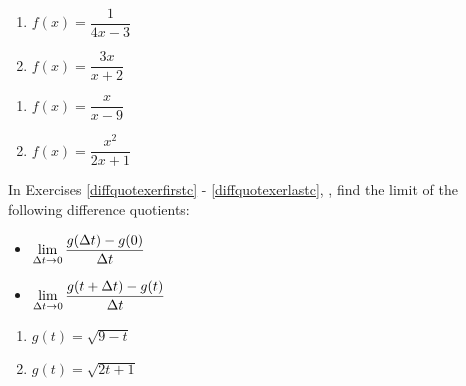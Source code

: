 \begin{multicols}{2}
\begin{enumerate}
\setcounter{enumi}{\value{HW}}

\item $f(x) = \dfrac{1}{4x-3}$ 
\item $f(x) = \dfrac{3x}{x+2}$ 

\setcounter{HW}{\value{enumi}}
\end{enumerate}
\end{multicols}

\begin{multicols}{2}
\begin{enumerate}
\setcounter{enumi}{\value{HW}}

\item $f(x) = \dfrac{x}{x - 9}$
\item $f(x) = \dfrac{x^2}{2x+1}$  \label{diffquotexerlastb}

\setcounter{HW}{\value{enumi}}
\end{enumerate}
\end{multicols}

In Exercises \ref{diffquotexerfirstc} - \ref{diffquotexerlastc}, , find the limit of the following difference quotients:

\begin{multicols}{2}

\begin{itemize}

\item  $\displaystyle{\lim_{\Delta t \rightarrow 0} \dfrac{g(\Delta t) - g(0)}{\Delta t}}$

\item  $\displaystyle{\lim_{\Delta t \rightarrow 0} \dfrac{g(t+\Delta t) - g(t)}{\Delta t}}$

\end{itemize}

\end{multicols}


\begin{multicols}{2}
\begin{enumerate}
\setcounter{enumi}{\value{HW}}

\item  $g(t) = \sqrt{9-t}$  \label{diffquotexerfirstc}
\item  $g(t) = \sqrt{2t+1}$

\setcounter{HW}{\value{enumi}}
\end{enumerate}
\end{multicols}

